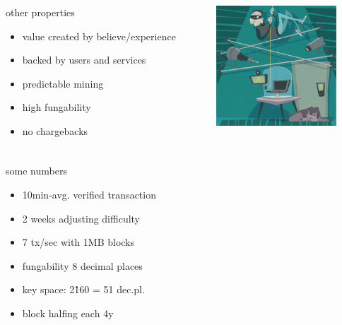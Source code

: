\documentclass[12pt,english]{beamer}
\begin{document}
\begin{frame}
	\frametitle{}
	\begin{columns}[T]
    \begin{column}{.5\textwidth}
	\begin{block}{other properties}
	\begin{itemize}
		\item value created by believe/experience
		\item backed by users and services
		\item predictable mining
		\item high fungability
		\item no chargebacks
	\end{itemize}
	\end{block}
    \end{column}
    \begin{column}{.4\textwidth}
		\includegraphics[width=4.5cm]{./img/btc_presentation/thief.png}
    \end{column}
  \end{columns}
\end{frame}

\begin{frame}
	\frametitle{}
	\begin{block}{some numbers}
	\begin{itemize}
		\item 10min-avg. verified transaction
		\item 2 weeks adjusting difficulty
		\item 7 tx/sec with 1MB blocks
		\item fungability 8 decimal places
		\item key space: 2\^160 = 51 dec.pl. 
		\item block halfing each 4y
	\end{itemize}
	\end{block}
\end{frame}
\end{document}
